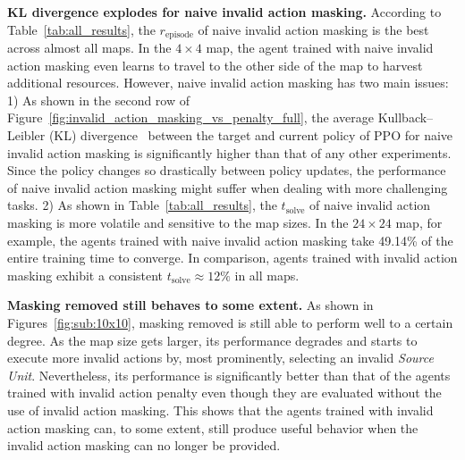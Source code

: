 \documentclass[letterpaper]{article}
\begin{document}
\textbf{KL divergence explodes for naive invalid action masking.} According to Table~\ref{tab:all_results}, the $r_{\text{episode}}$ of naive invalid action masking is the best across almost
all maps. In the $4\times4$ map, the agent trained with naive invalid action masking even learns to travel to the other side of the map to harvest additional resources. However, naive invalid action masking has two main issues: 1) As shown in the second row of Figure~\ref{fig:invalid_action_masking_vs_penalty_full}, the average Kullback–Leibler (KL) divergence~\cite{kullback1951information} between the target and current policy of PPO for naive invalid action masking is significantly higher than that of any other experiments. Since the policy changes so drastically between policy updates, the performance of naive invalid action masking might suffer when dealing with more challenging tasks. 2) As shown in Table~\ref{tab:all_results}, the $t_\text{solve}$ of naive invalid action masking is more volatile and sensitive to the map sizes. In the $24\times 24$ map, for example, the agents trained with naive invalid action masking take 49.14\% of the entire training time to converge. In comparison, agents trained with invalid action masking exhibit a consistent $t_\text{solve} \approx 12\%$  in all maps.


\textbf{Masking removed still behaves to some extent.} As shown in Figures~\ref{fig:sub:10x10}, masking removed is still able to perform well to a certain degree. As the map size gets larger, its performance degrades and starts to execute more invalid actions by, most prominently, selecting an invalid {\em Source Unit}. Nevertheless, its performance is significantly better than that of the agents trained with invalid action penalty even though they are evaluated without the use of invalid action masking. This shows that the agents trained with invalid action masking can, to some extent, still produce useful behavior when the invalid action masking can no longer be provided.


\end{document}
